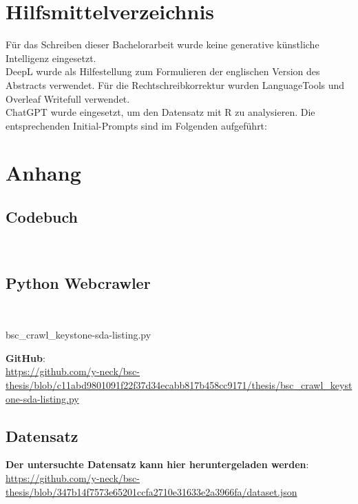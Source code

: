 \documentclass[12pt,a4paper]{article}        %
\begin{document}
\section{Hilfsmittelverzeichnis}
Für das Schreiben dieser Bachelorarbeit wurde keine generative künstliche Intelligenz eingesetzt. \\
DeepL wurde als Hilfestellung zum Formulieren der englischen Version des Abstracts verwendet. Für die Rechtschreibkorrektur wurden LanguageTools und Overleaf Writefull verwendet.\\
ChatGPT wurde eingesetzt, um den Datensatz mit R zu analysieren. Die entsprechenden Initial-Prompts sind im Folgenden aufgeführt:

\pagebreak
\section{Anhang}
\subsection{Codebuch}
~\label{appendix_codebook}

\subsection{Python Webcrawler}
~\label{appendix_crawler}
\begin{lstinputlisting}[language=Python, caption=Python Webcrawler für Keystone-SDA]{bsc_crawl_keystone-sda-listing.py}
\end{lstinputlisting}
\begin{tcolorbox}[
    width=\textwidth,    %
    boxrule=1pt,         %
    arc=0pt,             %
    colback=white,       %
    left=6pt, right=6pt, top=6pt, bottom=6pt
  ]
  \textbf{GitHub}:\\
  \url{https://github.com/y-neck/bsc-thesis/blob/c11abd9801091f22f37d34ecabb817b458cc9171/thesis/bsc_crawl_keystone-sda-listing.py}
\end{tcolorbox}
\subsection{Datensatz}
\label{appendix_dataset}
\begin{tcolorbox}[
    width=\textwidth,    %
    boxrule=1pt,         %
    arc=0pt,             %
    colback=white,       %
    left=6pt, right=6pt, top=6pt, bottom=6pt
  ]
  \textbf{Der untersuchte Datensatz kann hier heruntergeladen werden}: \\
  \url{https://github.com/y-neck/bsc-thesis/blob/347b14f7573e65201ccfa2710e31633e2a3966fa/dataset.json}
\end{tcolorbox}
\end{document}
